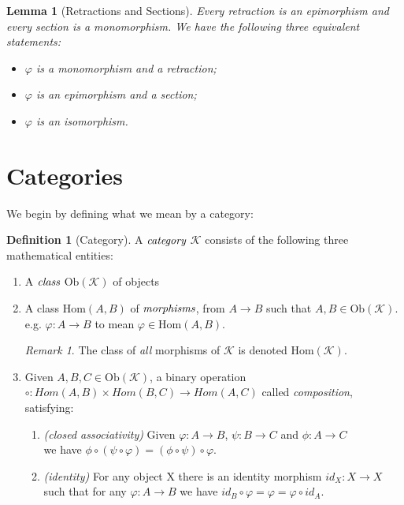 \documentclass[10pt, oneside, reqno]{amsart}
\theoremstyle{plain}%
\newtheorem{lem}[thm]{Lemma}
\theoremstyle{definition}
\newtheorem{defn}[thm]{Definition}
\theoremstyle{remark}
\newtheorem*{rem}{Remark}
\newcommand{\Cat}{\mathcal{K}}
\newcommand{\Id}{\mathit{id}_}
\begin{document}
\begin{lem}[Retractions and Sections]
Every retraction is an epimorphism and every section is a monomorphism.
We have the following three equivalent statements:
\begin{itemize}
\item $\varphi$ is a monomorphism and a retraction;
\item $\varphi$ is an epimorphism and a section;
\item $\varphi$ is an isomorphism.
\end{itemize}
\end{lem}


\section{Categories} %
\label{sec:categories}
We begin by defining what we mean by a category:
\begin{defn}[Category]
	A $\emph{category}$ $\Cat$ consists of the following three mathematical entities:
	\begin{enumerate}
		\item A $\emph{class}$ $\text{Ob}(\Cat)$ of objects
		
		\item A class $\text{Hom}(A,B)$ of $\emph{morphisms}$, from $A \longrightarrow B$ such that $A, B \in \text{Ob}(\Cat)$.
		\\
		e.g. $\varphi : A \to B$ to mean $\varphi \in \text{Hom}(A,B)$.
		\begin{rem}
		The class of \emph{all} morphisms of $\Cat$ is denoted $\text{Hom}(\Cat)$.
		\end{rem}

		\item Given $A, B, C \in \text{Ob}(\Cat)$, a binary operation $\circ : Hom(A,B) \times Hom(B,C) \to Hom(A,C)$ called \emph{composition},
		satisfying:
		\begin{enumerate}
			\item \emph{(closed associativity)} Given $\varphi : A \to B$, $\psi: B \to C$ and $\phi: A \to C$
			\\
			we have $\phi \circ (\psi \circ \varphi) = (\phi \circ \psi) \circ \varphi$.
			\\
			
			\item \emph{(identity)} For any object X there is an identity morphism $\Id{X} : X \to X$ such that for any $\varphi: A \to B$ we have $\Id{B} \circ \varphi = \varphi = \varphi \circ \Id{A}$.
			\\
		\end{enumerate}
	\end{enumerate}
\end{defn}
\end{document}

